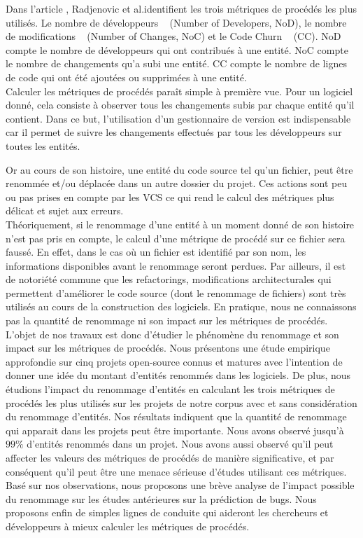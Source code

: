 Dans l'article \cite{radjenovic_software_2013}, Radjenovic et al.identifient les trois métriques de procédés les plus utilisés. Le nombre de développeurs ~\cite{weyuker_too_2008} (Number of Developers, NoD), le nombre de modifications ~\cite{graves_predicting_2000} (Number of Changes, NoC) et le Code Churn ~\cite{munson_code_1998} (CC). NoD compte le nombre de développeurs qui ont contribués à une entité. NoC compte le nombre de changements qu'a subi une entité. CC compte le nombre de lignes de code qui ont été ajoutées ou supprimées à une entité.\\
 

Calculer les métriques de procédés paraît simple à première vue. Pour un logiciel donné, cela consiste à observer tous les changements subis par chaque entité qu'il contient. Dans ce but, l'utilisation d'un gestionnaire de version est indispensable car il permet de suivre les changements effectués par tous les développeurs sur toutes les entités. 

Or au cours de son histoire, une entité du code source tel qu'un fichier, peut être renommée et/ou déplacée dans un autre dossier du projet. Ces actions sont peu ou pas prises en compte par les VCS ce qui rend le calcul des métriques plus délicat et sujet aux erreurs.\\

Théoriquement, si le renommage d'une entité à un moment donné de son histoire n'est pas pris en compte, le calcul d'une métrique de procédé sur ce fichier sera faussé. En effet, dans le cas où un fichier est identifié par son nom, les informations disponibles avant le renommage seront perdues. Par ailleurs, il est de notoriété commune que les refactorings, modifications architecturales qui permettent d'améliorer le code source (dont le renommage de fichiers) sont très utilisés au cours de la construction des logiciels. En pratique, nous ne connaissons pas la quantité de renommage ni son impact sur les métriques de procédés.\\

L’objet de nos travaux est donc d’étudier le phénomène du renommage et son impact sur les métriques de procédés. Nous présentons une étude empirique approfondie sur cinq projets open-source connus et matures avec l'intention de donner une idée du montant d'entités renommés dans les logiciels. De plus, nous étudions l'impact du renommage d'entités en calculant les trois métriques de procédés les plus utilisés sur les projets de notre corpus avec et sans considération du renommage d'entités. Nos résultats indiquent que la quantité de renommage qui apparait dans les projets peut être importante. Nous avons observé jusqu'à $99\%$ d'entités renommés dans un projet. Nous avons aussi observé qu'il peut affecter les valeurs des métriques de procédés de manière significative, et par conséquent qu'il peut être une menace sérieuse d'études utilisant ces métriques. Basé sur nos observations, nous proposons une brève analyse de l'impact possible du renommage sur les études antérieures sur la prédiction de bugs. Nous proposons enfin de simples lignes de conduite qui aideront les chercheurs et développeurs à mieux calculer les métriques de procédés.\\


